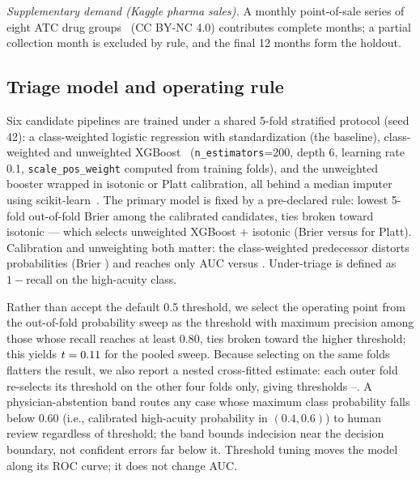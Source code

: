 \documentclass[conference]{IEEEtran}
\begin{document}
\emph{Supplementary demand (Kaggle pharma sales).} A monthly point-of-sale
series of eight ATC drug groups~\cite{zdravkovic2019pharma} (CC BY-NC 4.0)
contributes \Months{} complete months; a partial collection month is excluded
by rule, and the final 12 months form the holdout.

\subsection{Triage model and operating rule}
\label{sec:triage-method}

Six candidate pipelines are trained under a shared 5-fold stratified protocol
(seed 42): a class-weighted logistic regression with standardization (the
baseline), class-weighted and unweighted XGBoost~\cite{chen2016xgboost}
(\texttt{n\_estimators}=200, depth 6, learning rate 0.1,
\texttt{scale\_pos\_weight} computed from training folds), and the unweighted
booster wrapped in isotonic or Platt calibration, all behind a median imputer
using scikit-learn~\cite{pedregosa2011scikit}. The primary model is fixed by
a pre-declared rule: lowest 5-fold out-of-fold Brier among the calibrated
candidates, ties broken toward isotonic --- which selects unweighted XGBoost
$+$ isotonic (Brier \CalIsoBrier{} versus \CalPlattBrier{} for Platt).
Calibration and unweighting both matter: the class-weighted predecessor
distorts probabilities (Brier \BrierWeighted{}) and reaches only
\AUCWeighted{} AUC versus \AUCxgb{}. Under-triage is defined as
$1-\text{recall}$ on the high-acuity class.

Rather than accept the default 0.5 threshold, we select the operating point
from the out-of-fold probability sweep as the threshold with maximum precision
among those whose recall reaches at least 0.80, ties broken toward the higher
threshold; this yields $t=0.11$ for the pooled sweep. Because selecting on
the same folds flatters the result, we also report a nested cross-fitted
estimate: each outer fold re-selects its threshold on the other four folds
only, giving thresholds \NestedTmin--\NestedTmax. A physician-abstention band
routes any case whose maximum class probability falls below 0.60 (i.e.,
calibrated high-acuity probability in $(0.4, 0.6)$) to human review
regardless of threshold; the band bounds indecision near the decision
boundary, not confident errors far below it. Threshold tuning moves the model
along its ROC curve; it does not change AUC.


\end{document}
